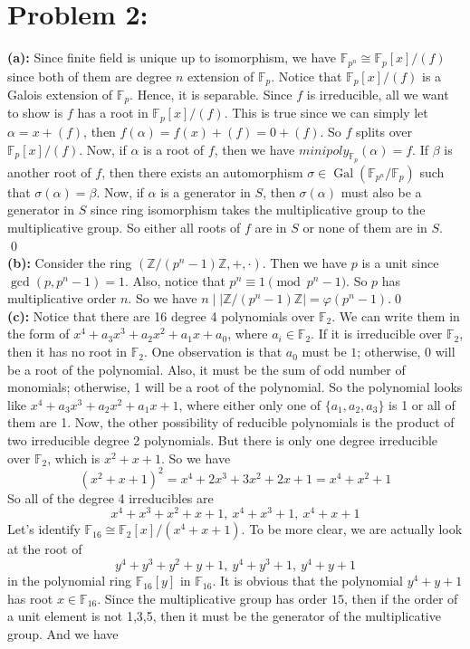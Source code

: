 \documentclass[12pt]{amsart}
\newcommand{\F}{\mathbb{F}}
\newcommand{\Z}{\mathbb{Z}}
\newcommand{\Gal}[0]{\operatorname{Gal}}
\begin{document}
\section*{Problem 2:}
\noindent\textbf{(a):} Since finite field is unique up to isomorphism, we have $\F_{p^n}\cong \F_p[x]/(f)$ since both of them are degree $n$ extension of $\F_p$. Notice that $\F_p[x]/(f)$ is a Galois extension of $\F_p$. Hence, it is separable. Since $f$ is irreducible, all we want to show is $f$ has a root in $\F_p[x]/(f)$. This is true since we can simply let $\alpha=x+(f)$, then $f(\alpha)=f(x)+(f)=0+(f)$. So $f$ splits over $\F_p[x]/(f)$. Now, if $\alpha$ is a root of $f$, then we have $minipoly_{\F_p}(\alpha)=f$. If $\beta$ is another root of $f$, then there exists an automorphism $\sigma\in \Gal(\F_{p^n}/\F_{p})$ such that $\sigma(\alpha)=\beta$. Now, if $\alpha$ is a generator in $S$, then $\sigma(\alpha)$ must also be a generator in $S$ since ring isomorphism takes the multiplicative group to the multiplicative group. So either all roots of $f$ are in $S$ or none of them are in $S$.\\\qed\\
\textbf{(b):} Consider the ring $(\Z/(p^n-1)\Z,+,\cdot)$. Then we have $p$ is a unit since $\gcd(p,p^n-1)=1$. Also, notice that $p^n\equiv 1\pmod{p^n-1}$. So $p$ has multiplicative order $n$. So we have $n\mid |\Z/(p^n-1)\Z|=\varphi(p^n-1)$.\qed\\
\textbf{(c):} Notice that there are 16 degree 4 polynomials over $\F_2$. We can write them in the form of $x^4+a_3x^3+a_2x^2+a_1x+a_0$, where $a_i\in\F_2$. If it is irreducible over $\F_2$, then it has no root in $\F_2$. One observation is that $a_0$ must be $1$; otherwise, $0$ will be a root of the polynomial. Also, it must be the sum of odd number of monomials; otherwise, 1 will be a root of the polynomial. So the polynomial looks like $x^4+a_3x^3+a_2x^2+a_1x+1$, where either only one of $\{a_1,a_2,a_3\}$ is 1 or all of them are 1. Now, the other possibility of reducible polynomials is the product of two irreducible degree 2 polynomials. But there is only one degree irreducible over $\F_2$, which is $x^2+x+1$. So we have 
\[(x^2+x+1)^2=x^4+2x^3+3x^2+2x+1=x^4+x^2+1\]
So all of the degree 4 irreducibles are 
\[x^4+x^3+x^2+x+1,\  x^4+x^3+1,\ x^4+x+1 \]
Let's identify $\F_{16}\cong\F_2[x]/(x^4+x+1) $. To be more clear, we are actually look at the root of 
\[y^4+y^3+y^2+y+1,\ y^4+y^3+1,\ y^4+y+1\]
in the polynomial ring $\F_{16}[y]$ in $\F_{16}$. It is obvious that the polynomial $y^4+y+1$ has root $x\in \F_{16}$. Since the multiplicative group has order $15$, then if the order of a unit element is not 1,3,5, then it must be the generator of the multiplicative group. And we have 
\end{document}

